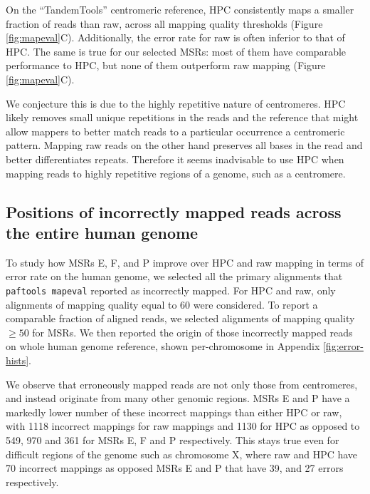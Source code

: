 \documentclass[
  11,
]{scrbook}
\begin{document}
On the ``TandemTools'' centromeric reference, HPC consistently maps a
smaller fraction of reads than raw, across all mapping quality
thresholds (Figure \ref{fig:mapeval}C). Additionally, the error rate for raw is
often inferior to that of HPC. The same is true for our selected MSRs:
most of them have comparable performance to HPC, but none of them
outperform raw mapping (Figure \ref{fig:mapeval}C).

We conjecture this is due to the highly repetitive nature of
centromeres. HPC likely removes small unique repetitions in the reads
and the reference that might allow mappers to better match reads to a
particular occurrence a centromeric pattern. Mapping raw reads on the
other hand preserves all bases in the read and better differentiates
repeats. Therefore it seems inadvisable to use HPC when mapping reads to
highly repetitive regions of a genome, such as a centromere.

\hypertarget{positions-of-incorrectly-mapped-reads-across-the-entire-human-genome}{%
\subsection{Positions of incorrectly mapped reads across the entire human genome}\label{positions-of-incorrectly-mapped-reads-across-the-entire-human-genome}}

To study how MSRs E, F, and P improve over HPC and raw mapping in terms
of error rate on the human genome, we selected all the primary
alignments that \texttt{paftools\ mapeval} reported as incorrectly mapped. For
HPC and raw, only alignments of mapping quality equal to 60 were
considered. To report a comparable fraction of aligned reads, we
selected alignments of mapping quality \(\geq 50\) for MSRs. We then
reported the origin of those incorrectly mapped reads on whole human
genome reference, shown per-chromosome in Appendix \ref{fig:error-hists}.

We observe that erroneously mapped reads are not only those from
centromeres, and instead originate from many other genomic regions. MSRs
E and P have a markedly lower number of these incorrect mappings than
either HPC or raw, with 1118 incorrect mappings for raw mappings and
1130 for HPC as opposed to 549, 970 and 361 for MSRs E, F and P
respectively. This stays true even for difficult regions of the genome
such as chromosome X, where raw and HPC have 70 incorrect mappings as
opposed MSRs E and P that have 39, and 27 errors respectively.
\end{document}
